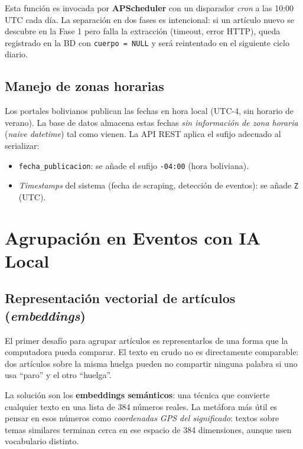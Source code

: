 \documentclass[12pt,a4paper]{article}
\begin{document}
Esta función es invocada por \textbf{APScheduler} con un disparador \textit{cron} a las 10:00 UTC cada día. La separación en dos fases es intencional: si un artículo nuevo se descubre en la Fase 1 pero falla la extracción (timeout, error HTTP), queda registrado en la BD con \texttt{cuerpo = NULL} y será reintentado en el siguiente ciclo diario.

\subsection{Manejo de zonas horarias}

Los portales bolivianos publican las fechas en hora local (UTC-4, sin horario de verano). La base de datos almacena estas fechas \textit{sin información de zona horaria} (\textit{naive datetime}) tal como vienen. La API REST aplica el sufijo adecuado al serializar:

\begin{itemize}[nosep]
  \item \texttt{fecha\_publicacion}: se añade el sufijo \texttt{-04:00} (hora boliviana).
  \item \textit{Timestamps} del sistema (fecha de scraping, detección de eventos): se añade \texttt{Z} (UTC).
\end{itemize}

\section{Agrupación en Eventos con IA Local}

\subsection{Representación vectorial de artículos (\textit{embeddings})}

El primer desafío para agrupar artículos es representarlos de una forma que la computadora pueda comparar. El texto en crudo no es directamente comparable: dos artículos sobre la misma huelga pueden no compartir ninguna palabra si uno usa ``paro'' y el otro ``huelga''.

La solución son los \textbf{embeddings semánticos}: una técnica que convierte cualquier texto en una lista de 384 números reales. La metáfora más útil es pensar en esos números como \textit{coordenadas GPS del significado}: textos sobre temas similares terminan cerca en ese espacio de 384 dimensiones, aunque usen vocabulario distinto.
\end{document}
